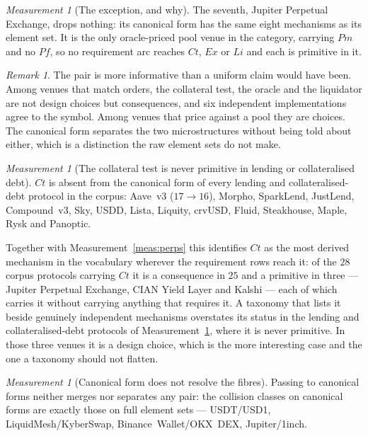 \documentclass[11pt,reqno]{amsart}
\theoremstyle{plain}
\theoremstyle{definition}
\theoremstyle{remark}
\newtheorem{measurement}[theorem]{Measurement}
\newtheorem{remark}[theorem]{Remark}
\begin{document}
\begin{measurement}[The exception, and why]\label{meas:jupiter}
The seventh, Jupiter Perpetual Exchange, drops nothing: its canonical form has
the same eight mechanisms as its element set. It is the only oracle-priced pool
venue in the category, carrying $Pm$ and no $Pf$, so no requirement arc reaches
$Ct$, $Ex$ or $Li$ and each is primitive in it.
\end{measurement}

\begin{remark}
The pair is more informative than a uniform claim would have been. Among venues
that match orders, the collateral test, the oracle and the liquidator are not
design choices but consequences, and six independent implementations agree to the
symbol. Among venues that price against a pool they are choices. The canonical
form separates the two microstructures without being told about either, which is
a distinction the raw element sets do not make.
\end{remark}

\begin{measurement}[The collateral test is never primitive in lending or collateralised debt]\label{meas:ct}
$Ct$ is absent from the canonical form of every lending and collateralised-debt
protocol in the corpus: Aave~v3 ($17 \to 16$), Morpho, SparkLend, JustLend,
Compound~v3, Sky, USDD, Lista, Liquity, crvUSD, Fluid, Steakhouse, Maple,
Rysk and Panoptic.
\end{measurement}

Together with Measurement~\ref{meas:perps} this identifies $Ct$ as the most
derived mechanism in the vocabulary wherever the requirement rows reach it: of
the $28$ corpus protocols carrying $Ct$ it is a consequence in $25$ and a
primitive in three --- Jupiter Perpetual Exchange, CIAN Yield Layer and Kalshi
--- each of which carries it without carrying anything that requires it. A
taxonomy that lists it beside genuinely independent mechanisms overstates its
status in the lending and collateralised-debt protocols of
Measurement~\ref{meas:ct}, where it is never primitive. In those three venues it
is a design choice, which is the more interesting case and the one a taxonomy
should not flatten.

\begin{measurement}[Canonical form does not resolve the fibres]\label{meas:fibres}
Passing to canonical forms neither merges nor separates any pair: the collision
classes on canonical forms are exactly those on full element sets --- USDT/USD1,
LiquidMesh/KyberSwap, Binance~Wallet/OKX~DEX, Jupiter/1inch.
\end{measurement}
\end{document}
